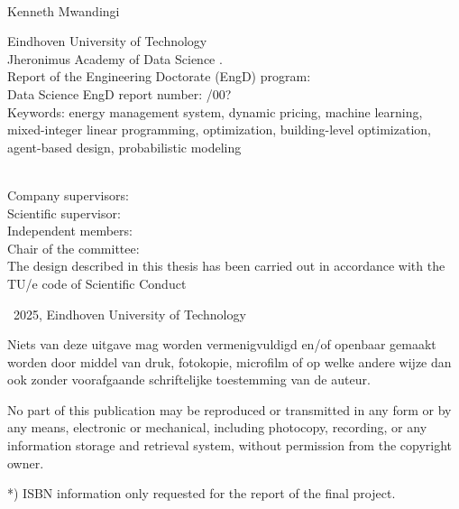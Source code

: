 \\

\vspace{0.1cm}
\noindent
Kenneth Mwandingi

\vspace{0.4cm}
\noindent
Eindhoven University of Technology \\
Jheronimus Academy of Data Science \the\year{} .  \\    
Report of the Engineering Doctorate (EngD) program: \\
Data Science EngD report number: \the\year{}/00? \\
Keywords: energy management system, dynamic pricing, machine learning, mixed-integer linear programming, optimization, building-level optimization, agent-based design, probabilistic modeling

\vspace{0.4cm}

\\
\noindent
Company supervisors:  \\

\noindent
Scientific supervisor:  \\

\noindent
Independent members:  \\

\noindent
Chair of the committee:  \\

\vspace{0.4cm}
\noindent
The design described in this thesis has been carried out in accordance with the TU/e code of Scientific Conduct

\vspace{0.4cm}
\noindent
\textcopyright\ 2025, Eindhoven University of Technology

\vspace{0.4cm}
\noindent
Niets van deze uitgave mag worden vermenigvuldigd en/of openbaar 
gemaakt worden door middel van druk, fotokopie, microfilm of op welke
andere wijze dan ook zonder voorafgaande schriftelijke toestemming 
van de auteur.

\vspace{0.4cm}
\noindent
No part of this publication may be reproduced or transmitted in any 
form or by any means, electronic or mechanical, including photocopy, 
recording, or any information storage and retrieval system, without 
permission from the copyright owner.

\vspace{0.4cm}
\noindent
*) ISBN information only requested for the report of the final project.
